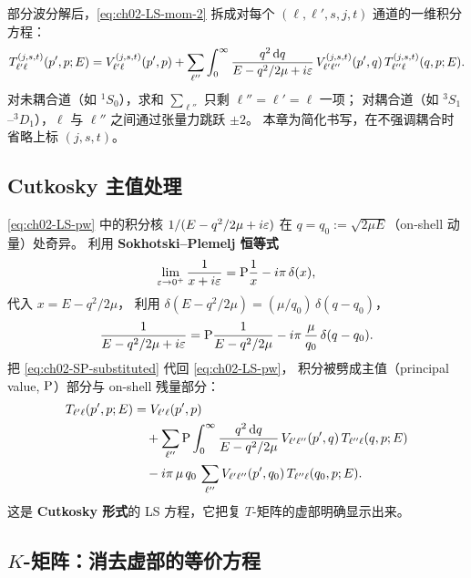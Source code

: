 部分波分解后，\cref{eq:ch02-LS-mom-2} 拆成对每个 $(\ell, \ell', s, j, t)$ 通道的一维积分方程：
\begin{equation}
  T_{\ell'\ell}^{(j,s,t)}(p', p; E)
  = V_{\ell'\ell}^{(j,s,t)}(p', p)
  + \sum_{\ell''} \int_0^{\infty} \frac{q^2\, \dd q}{E - q^2/2\mu + i\varepsilon}\,
      V_{\ell'\ell''}^{(j,s,t)}(p', q)\,
      T_{\ell''\ell}^{(j,s,t)}(q, p; E).
  \label{eq:ch02-LS-pw}
\end{equation}
对未耦合道（如 $^1S_0$），求和 $\sum_{\ell''}$ 只剩 $\ell'' = \ell' = \ell$ 一项；
对耦合道（如 $^3S_1$--$^3D_1$），$\ell$ 与 $\ell''$ 之间通过张量力跳跃 $\pm 2$。
本章为简化书写，在不强调耦合时省略上标 $(j, s, t)$。

\subsection{Cutkosky 主值处理}

\cref{eq:ch02-LS-pw} 中的积分核
$1/(E - q^2/2\mu + i\varepsilon)$
在 $q = q_0 := \sqrt{2\mu E}$（on-shell 动量）处奇异。
利用 \textbf{Sokhotski--Plemelj 恒等式}
\begin{equation}
  \lim_{\varepsilon \to 0^+} \frac{1}{x + i\varepsilon}
  = \mathrm{P} \frac{1}{x} - i\pi\, \delta(x),
  \label{eq:ch02-SP}
\end{equation}
代入 $x = E - q^2/2\mu$，
利用 $\delta(E - q^2/2\mu) = (\mu/q_0)\, \delta(q - q_0)$，
\begin{equation}
  \frac{1}{E - q^2/2\mu + i\varepsilon}
  = \mathrm{P} \frac{1}{E - q^2/2\mu}
   - i\pi\, \frac{\mu}{q_0}\, \delta(q - q_0).
  \label{eq:ch02-SP-substituted}
\end{equation}
把 \cref{eq:ch02-SP-substituted} 代回 \cref{eq:ch02-LS-pw}，
积分被劈成主值（principal value, $\mathrm{P}$）部分与 on-shell 残量部分：
\begin{align}
  T_{\ell'\ell}(p', p; E)
  &= V_{\ell'\ell}(p', p)                                                          \notag \\
  &\quad + \sum_{\ell''} \mathrm{P} \int_0^\infty
        \frac{q^2\, \dd q}{E - q^2/2\mu}\,
        V_{\ell'\ell''}(p', q)\, T_{\ell''\ell}(q, p; E)                            \notag \\
  &\quad - i\pi\, \mu\, q_0\,
        \sum_{\ell''} V_{\ell'\ell''}(p', q_0)\, T_{\ell''\ell}(q_0, p; E).
  \label{eq:ch02-LS-PV}
\end{align}
这是\textbf{ Cutkosky 形式}的 LS 方程，它把复 $T$-矩阵的虚部明确显示出来。

\subsection{$K$-矩阵：消去虚部的等价方程}

